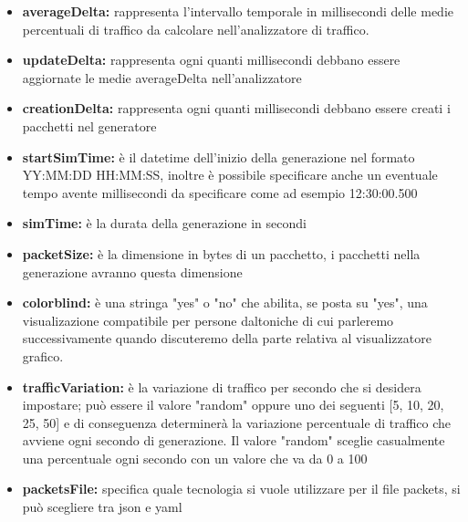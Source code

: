 \documentclass[binding=0.6cm]{sapthesis}
\begin{document}
\begin{itemize}
    \item \textbf{averageDelta:} rappresenta l'intervallo temporale in millisecondi 
    delle medie percentuali di traffico da calcolare nell'analizzatore di traffico.
    \item \textbf{updateDelta:} rappresenta ogni quanti millisecondi debbano essere aggiornate le medie averageDelta nell'analizzatore
    \item \textbf{creationDelta:} rappresenta ogni quanti millisecondi debbano essere creati i pacchetti nel generatore
    \item \textbf{startSimTime:} è il datetime dell'inizio della generazione nel formato \newline
    YY:MM:DD HH:MM:SS, inoltre è possibile specificare anche un eventuale tempo avente millisecondi da specificare come ad esempio 
    12:30:00.500
    \item \textbf{simTime:} è la durata della generazione in secondi
    \item \textbf{packetSize:} è la dimensione in bytes di un pacchetto, i pacchetti nella generazione avranno questa dimensione
    \item \textbf{colorblind:} è una stringa "yes" o "no" che abilita, se posta su "yes", una visualizazione compatibile per persone daltoniche
    di cui parleremo successivamente quando discuteremo della parte relativa al visualizzatore grafico.
    \item \textbf{trafficVariation:} è la variazione di traffico per secondo che si desidera impostare; 
    può essere il valore "random" oppure uno dei seguenti [5, 10, 20, 25, 50] e 
    di conseguenza determinerà la variazione percentuale di traffico che avviene 
    ogni secondo di generazione. Il valore "random" sceglie casualmente una percentuale 
    ogni secondo con un valore che va da 0 a 100
    \item \textbf{packetsFile:} specifica quale tecnologia si vuole utilizzare per il file packets, 
    si può scegliere tra json e yaml
\end{itemize}
\end{document}
